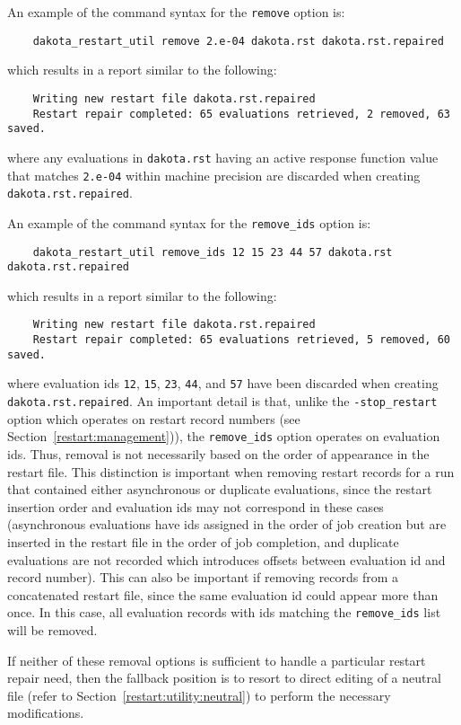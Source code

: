 An example of the command syntax for the \texttt{remove} option is:
\begin{small}
\begin{verbatim}
    dakota_restart_util remove 2.e-04 dakota.rst dakota.rst.repaired
\end{verbatim}
\end{small}
which results in a report similar to the following:
\begin{small}
\begin{verbatim}
    Writing new restart file dakota.rst.repaired
    Restart repair completed: 65 evaluations retrieved, 2 removed, 63 saved.
\end{verbatim}
\end{small}
where any evaluations in \texttt{dakota.rst} having an active response
function value that matches \texttt{2.e-04} within machine precision
are discarded when creating \texttt{dakota.rst.repaired}.

An example of the command syntax for the \texttt{remove\_ids} option is:
\begin{small}
\begin{verbatim}
    dakota_restart_util remove_ids 12 15 23 44 57 dakota.rst dakota.rst.repaired
\end{verbatim}
\end{small}
which results in a report similar to the following:
\begin{small}
\begin{verbatim}
    Writing new restart file dakota.rst.repaired
    Restart repair completed: 65 evaluations retrieved, 5 removed, 60 saved.
\end{verbatim}
\end{small}
where evaluation ids \texttt{12}, \texttt{15}, \texttt{23},
\texttt{44}, and \texttt{57} have been discarded when creating
\texttt{dakota.rst.repaired}. An important detail is that, unlike the 
\texttt{-stop\_restart} option which operates on restart record numbers 
(see Section~\ref{restart:management})), the \texttt{remove\_ids}
option operates on evaluation ids.  Thus, removal is not necessarily
based on the order of appearance in the restart file. This distinction
is important when removing restart records for a run that contained
either asynchronous or duplicate evaluations, since the restart
insertion order and evaluation ids may not correspond in these cases
(asynchronous evaluations have ids assigned in the order of job
creation but are inserted in the restart file in the order of job
completion, and duplicate evaluations are not recorded which
introduces offsets between evaluation id and record number). This can
also be important if removing records from a concatenated restart
file, since the same evaluation id could appear more than once. In
this case, all evaluation records with ids matching the
\texttt{remove\_ids} list will be removed.

If neither of these removal options is sufficient to handle a
particular restart repair need, then the fallback position is to
resort to direct editing of a neutral file (refer to
Section~\ref{restart:utility:neutral}) to perform the necessary
modifications.
